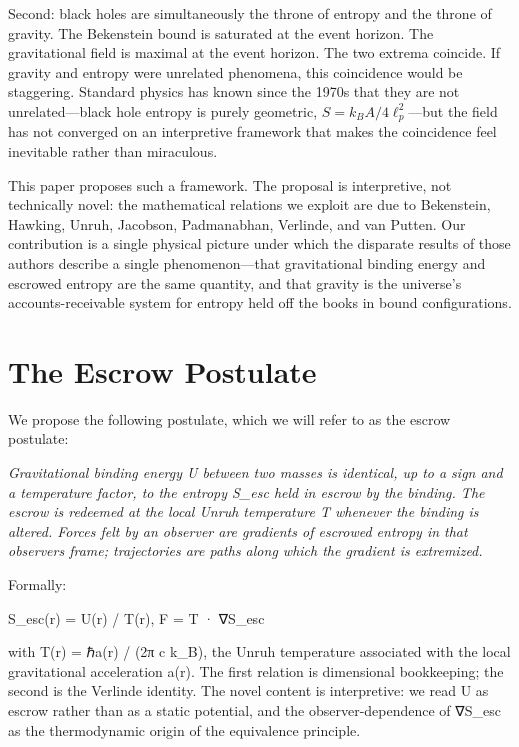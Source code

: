 \documentclass[11pt]{article}
\begin{document}
Second: black holes are simultaneously the throne of entropy and the throne of gravity. The Bekenstein bound is saturated at the event horizon. The gravitational field is maximal at the event horizon. The two extrema coincide. If gravity and entropy were unrelated phenomena, this coincidence would be staggering. Standard physics has known since the 1970s that they are not unrelated---black hole entropy is purely geometric, $S = k_B A / 4\ell_p^2$---but the field has not converged on an interpretive framework that makes the coincidence feel inevitable rather than miraculous.

This paper proposes such a framework. The proposal is interpretive, not technically novel: the mathematical relations we exploit are due to Bekenstein, Hawking, Unruh, Jacobson, Padmanabhan, Verlinde, and van Putten. Our contribution is a single physical picture under which the disparate results of those authors describe a single phenomenon---that gravitational binding energy and escrowed entropy are the same quantity, and that gravity is the universe's accounts-receivable system for entropy held off the books in bound configurations.

\section{The Escrow Postulate}\label{the-escrow-postulate}

We propose the following postulate, which we will refer to as the escrow postulate:

\emph{Gravitational binding energy U between two masses is identical, up to a sign and a temperature factor, to the entropy S\_esc held in escrow by the binding. The escrow is redeemed at the local Unruh temperature T whenever the binding is altered. Forces felt by an observer are gradients of escrowed entropy in that observer\textquotesingle s frame; trajectories are paths along which the gradient is extremized.}

Formally:

S\_esc(r) = \textbar U(r)\textbar{} / T(r), F = T · ∇S\_esc

with T(r) = ℏa(r) / (2π c k\_B), the Unruh temperature associated with the local gravitational acceleration a(r). The first relation is dimensional bookkeeping; the second is the Verlinde identity. The novel content is interpretive: we read U as escrow rather than as a static potential, and the observer-dependence of ∇S\_esc as the thermodynamic origin of the equivalence principle.
\end{document}
